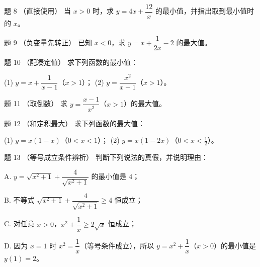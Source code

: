 \begin{problem}{题 8 （直接使用）}
当 $x>0$ 时，求 $y=4x+\dfrac{12}{x}$ 的最小值，并指出取到最小值时的 $x$。
\end{problem}

\begin{problem}{题 9 （负变量先转正）}
已知 $x<0$，求 $y=x+\dfrac{1}{2x}-2$ 的最大值。
\end{problem}

\begin{problem}{题 10 （配凑定值）}
求下列函数的最小值：

(1) $y=x+\dfrac{1}{x-1}$（$x>1$）；\quad
(2) $y=\dfrac{x^2}{x-1}$（$x>1$）。
\end{problem}

\begin{problem}{题 11 \starred（取倒数）}
求 $y=\dfrac{x-1}{x^2}$（$x>1$）的最大值。
\end{problem}

\begin{problem}{题 12 （和定积最大）}
求下列函数的最大值：

(1) $y=x(1-x)$（$0<x<1$）；\quad
(2) $y=x(1-2x)$（$0<x<\tfrac12$）。
\end{problem}

\begin{problem}{题 13 （等号成立条件辨析）}
判断下列说法的真假，并说明理由：

A. $y=\sqrt{x^2+1}+\dfrac{4}{\sqrt{x^2+1}}$ 的最小值是 $4$；

B. 不等式 $\sqrt{x^2+1}+\dfrac{4}{\sqrt{x^2+1}}\ge 4$ 恒成立；

C. 对任意 $x>0$，$x^2+\dfrac{1}{x}\ge 2\sqrt{x}$ 恒成立；

D. 因为 $x=1$ 时 $x^2=\dfrac1x$（等号条件成立），所以 $y=x^2+\dfrac{1}{x}$（$x>0$）的最小值是 $y(1)=2$。
\end{problem}

\clearpage
